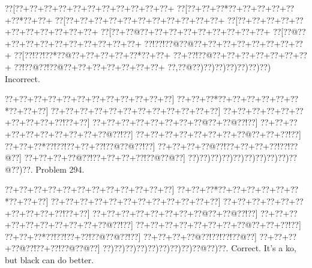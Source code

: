 \documentclass[a5paper]{article}
\begin{document}
\begin{center}
{\goo
\0??[\0??+\0??+\0??+\0??+\0??+\0??+\0??+\0??+\0??+\0??+\0??+
\0??[\0??+\0??+\0??*\0??+\0??+\0??+\0??+\0??+\0??*\0??+\0??+
\0??[\0??+\0??+\0??+\0??+\0??+\0??+\0??+\0??+\0??+\0??+\0??+
\0??[\0??+\0??+\0??+\0??+\0??+\0??+\0??+\0??+\0??+\0??+\0??+
\0??[\0??+\0??@\0??+\0??+\0??+\0??+\0??+\0??+\0??+\0??+\0??+
\0??[\0??@\0??+\0??+\0??+\0??+\0??+\0??+\0??+\0??+\0??+\0??+
\0??!\0??!\0??@\0??@\0??+\0??+\0??+\0??+\0??+\0??+\0??+\0??+
\0??[\0??!\0??!\0??*\0??@\0??+\0??+\0??+\0??+\0??*\0??+\0??+
\0??+\0??!\0??@\0??+\0??+\0??+\0??+\0??+\0??+\0??+
\0??!\0??@\0??!\0??@\0??+\0??+\0??+\0??+\0??+\0??+\0??+
\0??,\0??@\0??)\0??)\0??)\0??)\0??)\0??)\0??)
}
Incorrect. 

\end{center}
\newpage
\begin{center}
{\goo
\0??+\0??+\0??+\0??+\0??+\0??+\0??+\0??+\0??+\0??+\0??+\0??]
\0??+\0??+\0??*\0??+\0??+\0??+\0??+\0??+\0??*\0??+\0??+\0??]
\0??+\0??+\0??+\0??+\0??+\0??+\0??+\0??+\0??+\0??+\0??+\0??]
\0??+\0??+\0??+\0??+\0??+\0??+\0??+\0??+\0??+\0??!\0??+\0??]
\0??+\0??+\0??+\0??+\0??+\0??+\0??+\0??@\0??+\0??@\0??!\0??]
\0??+\0??+\0??+\0??+\0??+\0??+\0??+\0??+\0??+\0??@\0??!\0??]
\0??+\0??+\0??+\0??+\0??+\0??+\0??+\0??@\0??+\0??+\0??!\0??]
\0??+\0??+\0??*\0??!\0??!\0??+\0??+\0??!\0??@\0??@\0??!\0??]
\0??+\0??+\0??+\0??@\0??!\0??+\0??+\0??+\0??!\0??!\0??@\0??]
\0??+\0??+\0??+\0??@\0??!\0??+\0??+\0??+\0??!\0??@\0??@\0??]
\0??)\0??)\0??)\0??)\0??)\0??)\0??)\0??)\0??)\0??@\0??)\0??.
}
Problem 294.

\end{center}
\begin{center}
{\goo
\0??+\0??+\0??+\0??+\0??+\0??+\0??+\0??+\0??+\0??+\0??+\0??]
\0??+\0??+\0??*\0??+\0??+\0??+\0??+\0??+\0??*\0??+\0??+\0??]
\0??+\0??+\0??+\0??+\0??+\0??+\0??+\0??+\0??+\0??+\0??+\0??]
\0??+\0??+\0??+\0??+\0??+\0??+\0??+\0??+\0??+\0??!\0??+\0??]
\0??+\0??+\0??+\0??+\0??+\0??+\0??+\0??@\0??+\0??@\0??!\0??]
\0??+\0??+\0??+\0??+\0??+\0??+\0??+\0??+\0??+\0??@\0??!\0??]
\0??+\0??+\0??+\0??+\0??+\0??+\0??+\0??@\0??+\0??+\0??!\0??]
\0??+\0??+\0??*\0??!\0??!\0??+\0??!\0??@\0??@\0??!\0??]
\0??+\0??+\0??+\0??@\0??!\0??!\0??!\0??@\0??]
\0??+\0??+\0??+\0??@\0??!\0??+\0??!\0??@\0??@\0??]
\0??)\0??)\0??)\0??)\0??)\0??)\0??)\0??)\0??@\0??)\0??.
}
Correct. It's a ko, but black can do better.

\end{center}
\end{document}
